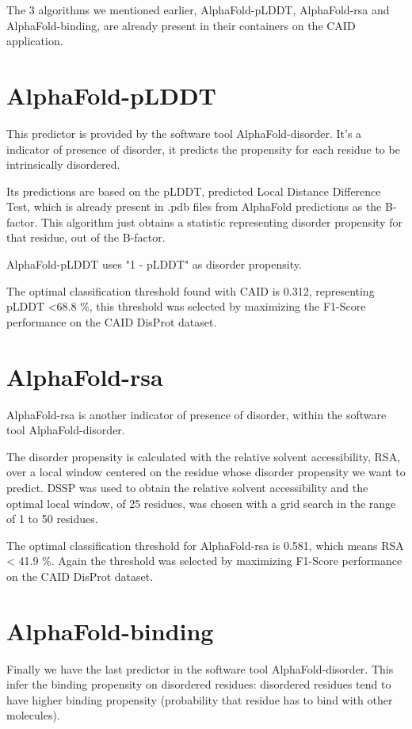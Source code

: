 The 3 algorithms we mentioned earlier, AlphaFold-pLDDT, AlphaFold-rsa and AlphaFold-binding, are already present in their containers on the CAID application.

\section{AlphaFold-pLDDT}
This predictor is provided by the software tool AlphaFold-disorder. It's a indicator of presence of disorder, it predicts the propensity for each residue to be intrinsically disordered.

Its predictions are based on the pLDDT, predicted Local Distance Difference Test, which is already present in .pdb files from AlphaFold predictions as the B-factor. This algorithm just obtains a statistic representing disorder propensity for that residue, out of the B-factor.

AlphaFold-pLDDT uses "1 - pLDDT" as disorder propensity. 

The optimal classification threshold found with CAID is 0.312, representing pLDDT <68.8 \%, this threshold was selected by maximizing the F1-Score performance on the CAID DisProt dataset.
\section{AlphaFold-rsa}


AlphaFold-rsa is another indicator of presence of disorder, within the software tool AlphaFold-disorder.

The disorder propensity is calculated with the relative solvent accessibility, RSA, over a local window centered on the residue whose disorder propensity we want to predict. DSSP was used to obtain the relative solvent accessibility and the optimal local window, of 25 residues, was chosen with a grid search in the range of 1 to 50 residues.

The optimal classification threshold for AlphaFold-rsa is 0.581, which means RSA < 41.9 \%. Again the threshold was selected by maximizing F1-Score performance on the CAID DisProt dataset.

\pagebreak

\section{AlphaFold-binding}
Finally we have the last predictor in the software tool AlphaFold-disorder. This infer the binding propensity on disordered residues: disordered residues tend to have higher binding propensity (probability that residue has to bind with other molecules).

